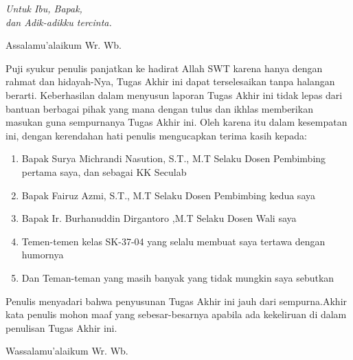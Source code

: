 \documentclass{jtetiskripsi}
\begin{document}
\cover

\approvalpage

\acknowledgment
\begin{flushright}
\emph{Untuk Ibu, Bapak,\\dan Adik-adikku tercinta.}
\end{flushright}

\preface
Assalamu'alaikum Wr. Wb.

\vspace{0.5cm}

Puji syukur penulis panjatkan ke hadirat Allah SWT karena hanya dengan rahmat dan hidayah-Nya, Tugas Akhir ini dapat terselesaikan tanpa halangan berarti. Keberhasilan dalam menyusun laporan Tugas Akhir ini tidak lepas dari bantuan berbagai pihak yang mana dengan tulus dan ikhlas memberikan masukan guna sempurnanya Tugas Akhir ini. Oleh karena itu dalam kesempatan ini, dengan kerendahan hati penulis mengucapkan terima kasih kepada:

\begin{enumerate}

\item{Bapak Surya Michrandi Nasution, S.T., M.T Selaku Dosen Pembimbing pertama saya, dan sebagai KK Seculab }
\item{Bapak Fairuz Azmi, S.T., M.T Selaku Dosen Pembimbing kedua saya }
\item {Bapak Ir. Burhanuddin Dirgantoro ,M.T Selaku Dosen Wali saya}
\item{Temen-temen kelas SK-37-04 yang selalu membuat saya tertawa dengan humornya}

\item{Dan Teman-teman yang masih banyak yang tidak mungkin saya sebutkan}

\end{enumerate}

Penulis menyadari bahwa penyusunan Tugas Akhir ini jauh dari sempurna.Akhir kata penulis mohon maaf yang sebesar-besarnya apabila ada kekeliruan di dalam penulisan Tugas Akhir ini.

\vspace{0.5cm}

Wassalamu'alaikum Wr. Wb.
\end{document}
